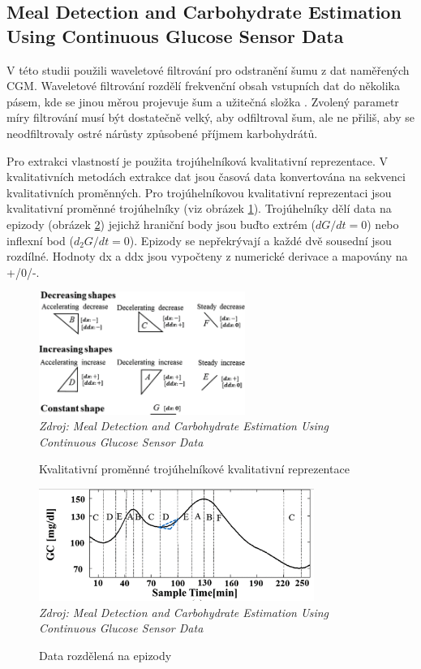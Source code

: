 \subsection{Meal Detection and Carbohydrate Estimation Using Continuous Glucose Sensor Data}
\label{ch:analyzaCHO:wavelet}

V této studii \citet{analyzaCHO.WaveletEst} použili waveletové filtrování pro odstranění šumu z dat naměřených CGM. Waveletové filtrování rozdělí frekvenční obsah vstupních dat do několika pásem, kde se jinou měrou projevuje šum a užitečná složka \citep{analyzaCHO.Wavelet}. Zvolený parametr míry filtrování musí být dostatečně velký, aby odfiltroval šum, ale ne přiliš, aby se neodfiltrovaly ostré nárůsty způsobené příjmem karbohydrátů.

Pro extrakci vlastností je použita trojúhelníková kvalitativní reprezentace. V kvalitativních metodách extrakce dat jsou časová data konvertována na sekvenci kvalitativních proměnných. Pro trojúhelníkovou kvalitativní reprezentaci jsou kvalitativní proměnné trojúhelníky (viz obrázek \ref{fig:analyza:wavelet1}). Trojúhelníky dělí data na epizody (obrázek \ref{fig:analyza:wavelet2}) jejichž hraniční body jsou buďto extrém ($dG/dt=0$) nebo inflexní bod ($d_{2}G/dt=0$). Epizody se nepřekrývají a každé dvě sousední jsou rozdílné. Hodnoty dx a ddx jsou vypočteny z numerické derivace a mapovány na +/0/-.

\begin{figure}[H]
\caption{Kvalitativní proměnné trojúhelníkové kvalitativní reprezentace}
\label{fig:analyza:wavelet1}
\centering
\includegraphics[width=0.6\textwidth]{img/analyzaCHO/wavelet1.png}\\
\textit{Zdroj: Meal Detection and Carbohydrate Estimation Using Continuous Glucose Sensor Data \citep{analyzaCHO.WaveletEst}}
\end{figure}
\begin{figure}[H]
\caption{Data rozdělená na epizody}
\label{fig:analyza:wavelet2}
\centering
\includegraphics[width=0.8\textwidth]{img/analyzaCHO/wavelet2.png}\\
\textit{Zdroj: Meal Detection and Carbohydrate Estimation Using Continuous Glucose Sensor Data \citep{analyzaCHO.WaveletEst}}
\end{figure}

